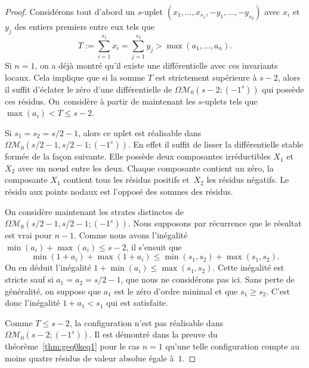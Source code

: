 \documentclass[JEP,XML,SOM,Unicode,francais,NoFloatCountersInSection,published]{cedram}
\let\mathcal\mathscr
\newcommand{\omoduli}[1][g]{{\Omega\mathcal M}_{\!#1}}
\theoremstyle{definition}
\begin{document}
\begin{proof}
Considérons tout d'abord un $s$-uplet $(x_{1},\dots,x_{s_{1}},-y_{1},\dots,-y_{s_{2}})$ avec $x_{i}$ et $y_{j}$ des entiers premiers entre eux tels que\vspace*{-3pt}\enlargethispage{.5\baselineskip}%
\[
T:=\sum_{i=1}^{s_{1}} x_{i} = \sum_{j=1}^{s_{2}} y_{j} > \max(a_{1},\dots,a_{n}).
\]
Si $n=1$, on a déjà montré qu'il existe une différentielle avec ces invariants locaux. Cela implique que si la somme $T$ est strictement supérieure à $s-2$, alors il suffit d'éclater le zéro d'une différentielle de $\omoduli[0](s-2;(-1^{s}))$ qui possède ces résidus. On~considère à partir de maintenant les $s$-uplets tels que $\max(a_{i}) < T \leq s-2$.

Si $s_{1}=s_{2}=s/2-1$, alors ce uplet est réalisable dans $\omoduli[0](s/2-1, s/2-1;(-1^{s}))$. En effet il suffit de lisser la différentielle stable formée de la façon suivante. Elle possède deux composantes irréductibles $X_{1}$ et~$X_{2}$ avec un nœud entre les deux. Chaque composante contient un zéro, la composante $X_{1}$ contient tous les résidus positifs et~$X_{2}$ les résidus négatifs. Le résidu aux points nodaux est l'opposé des sommes des résidus.

On considère maintenant les strates distinctes de $\omoduli[0](s/2-1, s/2-1;(-1^{s}))$. Nous supposons par récurrence que le résultat est vrai pour $n-1$. Comme nous avons l'inégalité $\min(a_{i})+\max(a_{i}) \leq s-2$, il s'ensuit que\vspace*{-3pt}
\[
\min(1+a_{i})+\max(1+a_{i}) \leq \min(s_{1},s_{2})+\max(s_{1},s_{2}).
\]
On en déduit l'inégalité $1 + \min(a_{i}) \leq \max (s_{1},s_{2})$. Cette inégalité est stricte sauf si $a_{1}=a_{2}=s/2-1$, que nous ne considérons pas ici. Sans perte de généralité, on suppose que $a_{1}$ est le zéro d’ordre minimal et que $s_{1}\geq s_{2}$. C'est donc l'inégalité $1 + a_1 < s_{1}$ qui est satisfaite.

Comme $T \leq s-2$, la configuration n'est pas réalisable dans $\omoduli[0](s-2;(-1^{s}))$. Il est démontré dans la preuve du théorème~\ref{thm:geq0keq1} pour le cas $n=1$ qu'une telle configuration compte au moins quatre résidus de valeur absolue égale à~$1$.


\end{proof}
\end{document}
